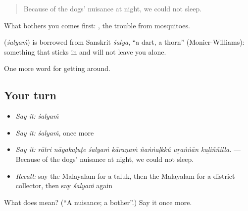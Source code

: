 \begin{quote}
Because of the dogs' nuisance at night, we could not sleep.
\end{quote}

What bothers you comes first: , the trouble from mosquitoes.

\begin{cousinweb}
\textbf{} (\emph{śalyaṁ}) is borrowed from Sanskrit \emph{śalya}, \textquotedblleft{}a dart, a thorn\textquotedblright{} (Monier-Williams): something that sticks in and will not leave you alone.
\end{cousinweb}

\begin{grammarlens}[title={What you've built}]
One more word for getting around.
\end{grammarlens}

\subsection*{Your turn}
\begin{itemize}
\raggedright
  \item \emph{Say it:} \emph{śalyaṁ}
  \item \emph{Say it:} \emph{śalyaṁ}, once more
  \item \emph{Say it:} \emph{rātri nāyakaḷuṭe śalyaṁ kāraṇaṁ ñaṅṅaḷkkŭ uṟaṅṅān kaḻiññilla.} — Because of the dogs' nuisance at night, we could not sleep.
  \item \emph{Recall:} say the Malayalam for a taluk, then the Malayalam for a district collector, then say \emph{śalyaṁ} again
\end{itemize}

\begin{tcolorbox}[breakable,colback=teal!4,colframe=teal!35!black,title={Before you move on}]
What does  mean? (\textquotedblleft{}A nuisance; a bother\textquotedblright{}.) Say it once more.
\end{tcolorbox}
